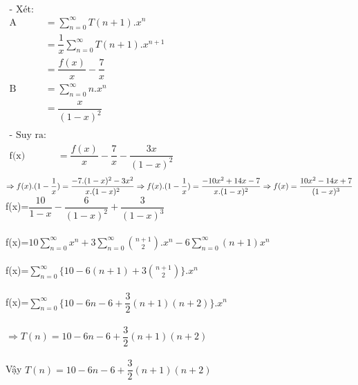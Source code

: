 \documentclass[12pt, letterpaper]{article}
\begin{document}
\begin{enumerate}
    $\begin{aligned}
    \text{- Xét: }\\
    \text{A}   
          &=\sum_{n = 0}^{\infty}T(n+1).x^n\\
          &=\dfrac{1}{x}\sum_{n = 0}^{\infty}T(n+1).x^{n+1}\\
          &=\dfrac{f(x)}{x} - \dfrac{7}{x}\\
    \text{B}
          &=\sum_{n = 0}^{\infty}n.x^n\\
          &=\dfrac{x}{(1-x)^2} \\
    \end{aligned}$\\
    $\begin{aligned}
      \text{- Suy ra: }\\
      \text{f(x)}   
            &=\dfrac{f(x)}{x} - \dfrac{7}{x}- \dfrac{3x}{(1-x)^2}\\
    \end{aligned}$\\
            $\Rightarrow f(x).(1-\dfrac{1}{x}) = \dfrac{-7.(1-x)^2-3x^2}{x.(1-x)^2}\\\\
            \Rightarrow f(x).(1-\dfrac{1}{x}) = \dfrac{-10x^2+14x-7}{x.(1-x)^2} \\\\
            \Rightarrow f(x)=\dfrac{10x^2-14x+7}{(1-x)^3}\\\\$
            f(x)=$\dfrac{10}{1-x}-\dfrac{6}{(1-x)^2}+\dfrac{3}{(1-x)^3}$\\\\
            f(x)=$10\sum_{n = 0}^{\infty}x^n + 3\sum_{n = 0}^{\infty}\binom{n+1}{2}.x^n - 6\sum_{n = 0}^{\infty}(n+1)x^n $\\\\
            f(x)=$\sum_{n = 0}^{\infty}\{ 10 - 6(n+1) +3\binom{n+1}{2}\}.x^n$\\\\
            f(x)=$\sum_{n = 0}^{\infty}\{ 10 - 6n - 6 +\dfrac{3}{2}(n+1)(n+2)\}.x^n$\\\\
            $\Rightarrow T(n) = 10 - 6n - 6 +\dfrac{3}{2}(n+1)(n+2)$\\\\
    Vậy $T(n) = 10 - 6n - 6 +\dfrac{3}{2}(n+1)(n+2)$


\end{enumerate}
\end{document}
